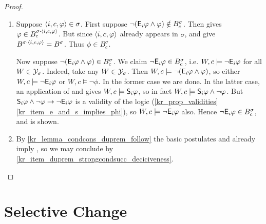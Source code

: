 \begin{proof}\leavevmode
    \begin{enumerate}
        \item Suppose $\tuple{i, c, \phi} \in \sigma$. First suppose
              $\neg(\E_i\phi \land \phi) \notin B^\sigma_c$. Then
              \strongcondsucc{} gives $\phi \in B^{\sigma \concat \tuple{i, c,
              \phi}}_c$. But since $\tuple{i, c, \phi}$ already appears in
              $\sigma$, \rearr{} and \duprem{} give $B^{\sigma \concat
              \tuple{i, c, \phi}} = B^\sigma$. Thus $\phi \in B^\sigma_c$.

              Now suppose $\neg(\E_i\phi \land \phi) \in B^\sigma_c$. We claim
              $\neg\E_i\phi \in B^\sigma_c$, i.e. $W, c \models \neg\E_i\phi$
              for all $W \in \Y_\sigma$. Indeed, take any
              $W \in \Y_\sigma$. Then $W, c \models \neg(\E_i\phi \land \phi)$,
              so either $W, c \models \neg\E_i\phi$ or $W, c \models \neg\phi$.
              In the former case we are done. In the latter case, an
              application of \soundness{} and \containment{} gives $W, c
              \models \S_i\phi$, so in fact $W, c \models \S_i\phi \land
              \neg\phi$. But $\S_i\phi \land \neg\phi \limplies \neg\E_i\phi$
              is a validity of the logic (\cref{kr_prop_validities}
              \cref{kr_item_e_and_s_implies_phi}), so $W, c \models
              \neg\E_i\phi$ also. Hence $\neg\E_i\phi \in B^\sigma_c$, and
              \decisiveness{} is shown.

          \item By \cref{kr_lemma_condcons_duprem_follow} the basic postulates
              and \incvac{} already imply \duprem{}, so we may conclude by
              \cref{kr_item_duprem_strongcondsucc_deciciveness}.
    \end{enumerate}
\end{proof}

\section{Selective Change}
\label{kr_sec_selective_change}

